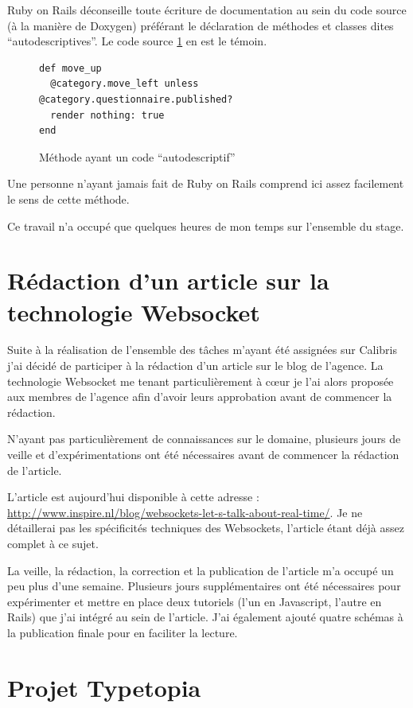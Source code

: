 \documentclass[12pt,a4paper]{book}
\begin{document}
Ruby on Rails déconseille toute écriture de documentation au sein du code source (à la manière de Doxygen) préférant le déclaration de méthodes et classes dites ``autodescriptives''. Le code source \cref{fig.autodesc} en est le témoin.

  \begin{figure}[h]
  \lstset{language=ruby}
  \begin{lstlisting}
def move_up
  @category.move_left unless @category.questionnaire.published?
  render nothing: true
end 
  \end{lstlisting}
   \caption{Méthode ayant un code ``autodescriptif''}
  \label{fig.autodesc}
  \end{figure}
  
Une personne n'ayant jamais fait de Ruby on Rails comprend ici assez facilement le sens de cette méthode.

Ce travail n'a occupé que quelques heures de mon temps sur l'ensemble du stage.

\section{Rédaction d'un article sur la technologie Websocket}

Suite à la réalisation de l'ensemble des tâches m'ayant été assignées sur Calibris j'ai décidé de participer à la rédaction d'un article sur le blog de l'agence. La technologie Websocket me tenant particulièrement à cœur je l'ai alors proposée aux membres de l'agence afin d'avoir leurs approbation avant de commencer la rédaction.

N'ayant pas particulièrement de connaissances sur le domaine, plusieurs jours de veille et d'expérimentations ont été nécessaires avant de commencer la rédaction de l'article.

L'article est aujourd'hui disponible à cette adresse : \url{http://www.inspire.nl/blog/websockets-let-s-talk-about-real-time/}. Je ne détaillerai pas les spécificités techniques des Websockets, l'article étant déjà assez complet à ce sujet.

La veille, la rédaction, la correction et la publication de l'article m'a occupé un peu plus d'une semaine. Plusieurs jours supplémentaires ont été nécessaires pour expérimenter et mettre en place deux tutoriels (l'un en Javascript, l'autre en Rails) que j'ai intégré au sein de l'article. J'ai également ajouté quatre schémas à la publication finale pour en faciliter la lecture.

\section{Projet Typetopia}
\end{document}
